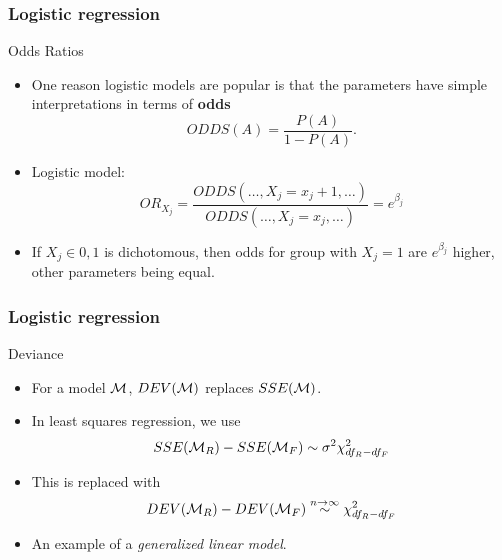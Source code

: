 \documentclass[handout]{beamer}
\begin{document}
   \begin{frame} \frametitle{Logistic regression}

   \begin{block}
   {Odds Ratios}

   \begin{itemize}
   \item     One reason logistic models are popular is that the
       parameters have simple interpretations in terms of {\bf odds}
   $$
   ODDS(A) = \frac{P(A)}{1-P(A)}.
   $$

   \item Logistic model:
   $$
   OR_{X_j} = \frac{ODDS(\dots, X_j=x_j+1, \dots)}{ODDS(\dots, X_j=x_j, \dots)} = e^{\beta_j}
   $$


   \item If $X_j \in {0, 1}$ is dichotomous, then odds for group with $X_j = 1$ are
       $e^{\beta_j}$ higher, other parameters being equal.

   \end{itemize}
   \end{block}
   \end{frame}


   \begin{frame} \frametitle{Logistic regression}

   \begin{block}
         {Deviance}
         \begin{itemize}
         \item For a model ${\cal M}$, $DEV({\cal M})$ replaces $SSE({\cal M})$.


   \item In least squares regression, we use
   $$
   SSE({\cal M}_R) - SSE({\cal M}_F) \sim \sigma^2 \chi^2_{df_R-df_F}$$

   \item This is replaced with
   $$
   DEV({\cal M}_R) - DEV({\cal M}_F) \overset{n \rightarrow \infty}{\sim} \chi^2_{df_R-df_F}$$

   \item An example of a {\em generalized linear model}.

         \end{itemize}
   \end{block}
   \end{frame}

\end{document}
